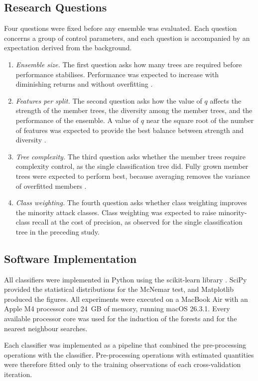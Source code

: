 \documentclass[conference]{IEEEtran}
\begin{document}
\subsection{Research Questions}

Four questions were fixed before any ensemble was evaluated. Each question concerns a group of control parameters, and each question is accompanied by an expectation derived from the background.

\begin{enumerate}
\item \textit{Ensemble size.} The first question asks how many trees are required before performance stabilises. Performance was expected to increase with diminishing returns and without overfitting \cite{breiman2001}.
\item \textit{Features per split.} The second question asks how the value of $q$ affects the strength of the member trees, the diversity among the member trees, and the performance of the ensemble. A value of $q$ near the square root of the number of features was expected to provide the best balance between strength and diversity \cite{hastie}.
\item \textit{Tree complexity.} The third question asks whether the member trees require complexity control, as the single classification tree did. Fully grown member trees were expected to perform best, because averaging removes the variance of overfitted members \cite{breiman1996}.
\item \textit{Class weighting.} The fourth question asks whether class weighting improves the minority attack classes. Class weighting was expected to raise minority-class recall at the cost of precision, as observed for the single classification tree in the preceding study.
\end{enumerate}

\subsection{Software Implementation}
All classifiers were implemented in Python using the scikit-learn library \cite{sklearn}. SciPy provided the statistical distributions for the McNemar test, and Matplotlib produced the figures. All experiments were executed on a MacBook Air with an Apple M4 processor and 24~GB of memory, running macOS 26.3.1. Every available processor core was used for the induction of the forests and for the nearest neighbour searches.

Each classifier was implemented as a pipeline that combined the pre-processing operations with the classifier. Pre-processing operations with estimated quantities were therefore fitted only to the training observations of each cross-validation iteration.
\end{document}
